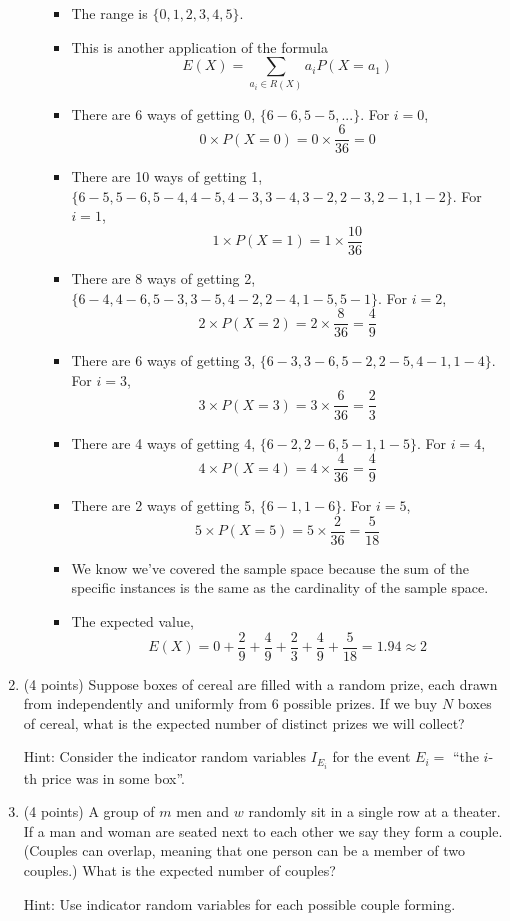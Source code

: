 \documentclass[11pt]{article}
\begin{document}
\begin{enumerate}
\begin{itemize}
\begin{itemize}
		\item The range is $\{0, 1, 2, 3, 4, 5\}$.
		\item This is another application of the formula
			  \[E(X) = \sum_{a_i \in R(X)}a_i P(X = a_1)\]
		\item There are 6 ways of getting 0, $\{6 - 6, 5 - 5, ...\}$. For $i = 0$,
		      \[ 0 \times P(X = 0) = 0 \times \frac{6}{36} = 0 \]
		\item There are 10 ways of getting 1, $\{6 - 5, 5 - 6, 5 - 4, 4 - 5, 4 - 3, 3 - 4, 3 - 2, 2 - 3, 2 - 1, 1 - 2\}$. For $i = 1$,
		      \[ 1 \times P(X = 1) = 1 \times \frac{10}{36} \]
		\item There are 8 ways of getting 2, $\{6 - 4, 4 - 6, 5 - 3, 3 - 5, 4 - 2, 2 - 4, 1 - 5, 5 - 1\}$. For $i = 2$,
			  \[ 2 \times P(X = 2) = 2 \times \frac{8}{36} = \frac{4}{9}\]
		\item There are 6 ways of getting 3, $\{6 - 3, 3 - 6, 5 - 2, 2 - 5, 4 - 1, 1 - 4\}$. For $i = 3$,
			  \[ 3 \times P(X = 3) = 3 \times \frac{6}{36} = \frac{2}{3}\]
	    \item There are 4 ways of getting 4, $\{6 - 2, 2 - 6, 5 - 1, 1 - 5\}$. For $i = 4$,
	          \[ 4 \times P(X = 4) = 4 \times \frac{4}{36} = \frac{4}{9}\]
	    \item There are 2 ways of getting 5, $\{6 - 1, 1 - 6\}$. For $i = 5$,
	          \[ 5 \times P(X = 5) = 5 \times \frac{2}{36} = \frac{5}{18}\]
	    \item We know we've covered the sample space because the sum of the specific instances is the same as the cardinality of the sample space.
	    \item The expected value,
	    		  \[E(X) = 0 + \frac{2}{9} + \frac{4}{9} + \frac{2}{3} + \frac{4}{9} +  \frac{5}{18} = 1.94 \approx 2\]
	
	\end{itemize}

\end{itemize}

\item (4 points) Suppose boxes of cereal are filled with a random prize,
each drawn from independently and uniformly from $6$ possible prizes.
If we buy $N$ boxes of cereal, what is the expected number of distinct
prizes we will collect? \begin{small}\textsf{Hint: Consider the indicator
random variables $I_{E_i}$ for the event $E_i =$ ``the $i$-th price was
in some box''.}\end{small}

\item (4 points) A group of $m$ men and $w$ randomly sit in a single row at a
theater.  If a man and woman are seated next to each other we say they form a
couple.  (Couples can overlap, meaning that one person can be a member of two
couples.)  What is the expected number of couples?
\begin{small}\textsf{Hint: Use indicator
random variables for each possible couple forming.
}\end{small}


\end{enumerate}
\end{document}
